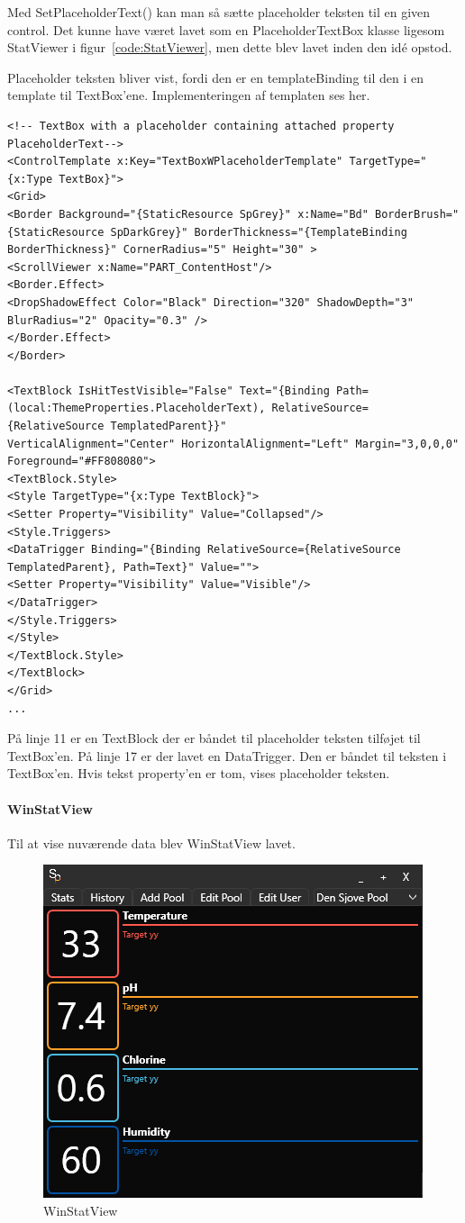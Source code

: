 Med SetPlaceholderText() kan man så sætte placeholder teksten til en given control.
Det kunne have været lavet som en PlaceholderTextBox klasse ligesom StatViewer i figur~\ref{code:StatViewer}, men dette blev lavet inden den idé opstod.

Placeholder teksten bliver vist, fordi den er en templateBinding til den i en template til TextBox'ene. Implementeringen af templaten ses her.
\begin{lstlisting}[caption=TextBoxWPlaceholderTemplate, label=code:TextBoxWPlaceholderTemplate]
<!-- TextBox with a placeholder containing attached property PlaceholderText-->
<ControlTemplate x:Key="TextBoxWPlaceholderTemplate" TargetType="{x:Type TextBox}">
<Grid>
<Border Background="{StaticResource SpGrey}" x:Name="Bd" BorderBrush="{StaticResource SpDarkGrey}" BorderThickness="{TemplateBinding BorderThickness}" CornerRadius="5" Height="30" >
<ScrollViewer x:Name="PART_ContentHost"/>
<Border.Effect>
<DropShadowEffect Color="Black" Direction="320" ShadowDepth="3" BlurRadius="2" Opacity="0.3" />
</Border.Effect>
</Border>

<TextBlock IsHitTestVisible="False" Text="{Binding Path=(local:ThemeProperties.PlaceholderText), RelativeSource={RelativeSource TemplatedParent}}" 
VerticalAlignment="Center" HorizontalAlignment="Left" Margin="3,0,0,0" Foreground="#FF808080">
<TextBlock.Style>
<Style TargetType="{x:Type TextBlock}">
<Setter Property="Visibility" Value="Collapsed"/>
<Style.Triggers>
<DataTrigger Binding="{Binding RelativeSource={RelativeSource TemplatedParent}, Path=Text}" Value="">
<Setter Property="Visibility" Value="Visible"/>
</DataTrigger>
</Style.Triggers>
</Style>
</TextBlock.Style>
</TextBlock>
</Grid>
...
\end{lstlisting}
På linje 11 er en TextBlock der er båndet til placeholder teksten tilføjet til TextBox'en. 
På linje 17 er der lavet en DataTrigger. Den er båndet til teksten i TextBox'en. Hvis tekst property'en er tom, vises placeholder teksten.
\paragraph{WinStatView}
Til at vise nuværende data blev WinStatView lavet.
\begin{figure}[h]
	\centering
	\includegraphics[width=0.5\linewidth]{figs/implementering/winstatview}
	\caption{WinStatView}
	\label{fig:winstatview}
\end{figure}

